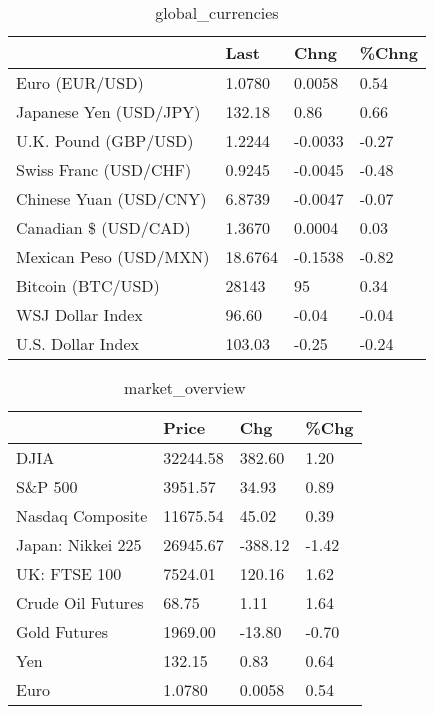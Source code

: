 \documentclass{article}%
\begin{document}
%


\begin{table}[htbp]%
\caption{global\_currencies}%
\centering%
\begin{adjustbox}{width=1\textwidth}%
\begin{tabular}{llll}
\toprule
                       &    Last &    Chng & \%Chng \\
\midrule
        Euro (EUR/USD) &  1.0780 &  0.0058 &  0.54 \\
Japanese Yen (USD/JPY) &  132.18 &    0.86 &  0.66 \\
  U.K. Pound (GBP/USD) &  1.2244 & -0.0033 & -0.27 \\
 Swiss Franc (USD/CHF) &  0.9245 & -0.0045 & -0.48 \\
Chinese Yuan (USD/CNY) &  6.8739 & -0.0047 & -0.07 \\
  Canadian \$ (USD/CAD) &  1.3670 &  0.0004 &  0.03 \\
Mexican Peso (USD/MXN) & 18.6764 & -0.1538 & -0.82 \\
     Bitcoin (BTC/USD) &   28143 &      95 &  0.34 \\
      WSJ Dollar Index &   96.60 &   -0.04 & -0.04 \\
     U.S. Dollar Index &  103.03 &   -0.25 & -0.24 \\
\bottomrule
\end{tabular}
%
\end{adjustbox}%
\end{table}

%


\begin{table}[htbp]%
\caption{market\_overview}%
\centering%
\begin{adjustbox}{width=1\textwidth}%
\begin{tabular}{llll}
\toprule
                  &    Price &     Chg &  \%Chg \\
\midrule
             DJIA & 32244.58 &  382.60 &  1.20 \\
          S\&P 500 &  3951.57 &   34.93 &  0.89 \\
 Nasdaq Composite & 11675.54 &   45.02 &  0.39 \\
Japan: Nikkei 225 & 26945.67 & -388.12 & -1.42 \\
     UK: FTSE 100 &  7524.01 &  120.16 &  1.62 \\
Crude Oil Futures &    68.75 &    1.11 &  1.64 \\
     Gold Futures &  1969.00 &  -13.80 & -0.70 \\
              Yen &   132.15 &    0.83 &  0.64 \\
             Euro &   1.0780 &  0.0058 &  0.54 \\
\bottomrule
\end{tabular}
%
\end{adjustbox}%
\end{table}

%
\end{document}
